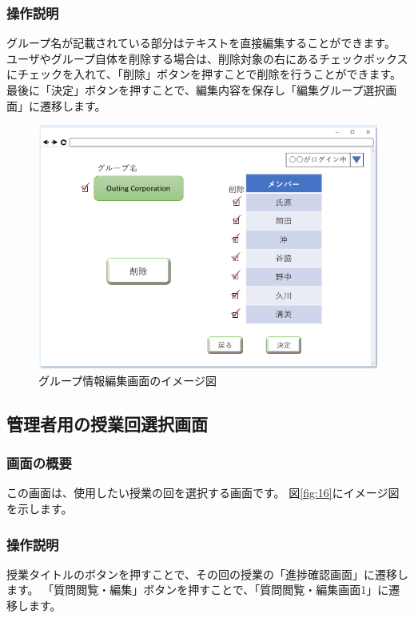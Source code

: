 \subsubsection{操作説明}
グループ名が記載されている部分はテキストを直接編集することができます。
ユーザやグループ自体を削除する場合は、削除対象の右にあるチェックボックスにチェックを入れて、「削除」ボタンを押すことで削除を行うことができます。
最後に「決定」ボタンを押すことで、編集内容を保存し「編集グループ選択画面」に遷移します。

\begin{figure}[htbp]
  \begin{center}
    \includegraphics[width=0.7\linewidth,clip]{./img/15.png}
    \caption{グループ情報編集画面のイメージ図}\label{fig:15}
  \end{center}
\end{figure}

\newpage

\subsection{管理者用の授業回選択画面}
\subsubsection{画面の概要}
この画面は、使用したい授業の回を選択する画面です。
図\ref{fig:16}にイメージ図を示します。

\subsubsection{操作説明}
授業タイトルのボタンを押すことで、その回の授業の「進捗確認画面」に遷移します。
「質問閲覧・編集」ボタンを押すことで、「質問閲覧・編集画面1」に遷移します。

